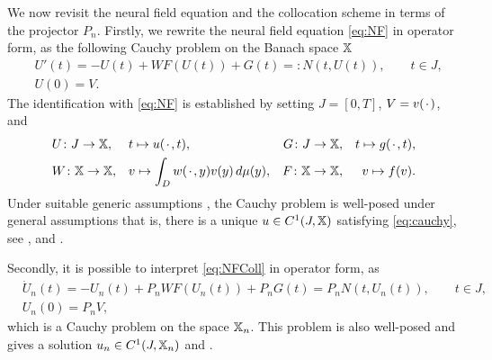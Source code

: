 \documentclass[a4paper]{siamart190516}
\begin{document}
We now revisit the neural field equation and the collocation scheme in terms of the
projector $P_n$. Firstly, we rewrite the neural field equation \cref{eq:NF} in
operator form, as the following Cauchy problem on the Banach space $\mathbb{X}$
\begin{equation}\label{eq:cauchy}
  \begin{aligned}
  & U'(t) = - U(t) + WF(U(t)) + G(t) =:  N(t,U(t)), \qquad t \in J, \\
  & U(0) = V.
  \end{aligned}
\end{equation}
The identification with \cref{eq:NF} is established by setting $J = [0,T]$,
$V = v({\mkern 2mu\cdot\mkern 2mu})$, and
\[  
  \begin{aligned}
   & U \colon J \to \mathbb{X}, && t \mapsto u({\mkern 2mu\cdot\mkern 2mu},t),
   & G \colon J \to \mathbb{X}, && t \mapsto g({\mkern 2mu\cdot\mkern 2mu},t), \\
   & W \colon \mathbb{X} \to \mathbb{X}, && v \mapsto \int_{D} w({\mkern 2mu\cdot\mkern 2mu},y) v(y) \,d \mu(y),
   & F \colon \mathbb{X} \to \mathbb{X}, && v \mapsto f(v). 
  \end{aligned}
\]
Under suitable generic assumptions , the Cauchy problem
is well-posed under general assumptions that is, there is a unique $u \in
C^1(J,\mathbb{X})$ satisfying \cref{eq:cauchy}, see
\cite{Potthast:2009bd,Faugeras:2009gn}, and \cite[Lemma 2.7]{Avitabile:2023ab}.

Secondly, it is possible to interpret \cref{eq:NFColl} in operator form, as
\begin{equation}\label{eq:cauchyPn}
  \begin{aligned}
  & \dot U_n(t) = - U_n(t) + P_n WF(U_n(t)) + P_n G(t) =  P_n N(t,U_n(t)), \qquad t \in J, \\
  & U_n(0) = P_n V,
  \end{aligned}
\end{equation}
which is a Cauchy problem on the space $\mathbb{X}_{n}$. This problem is also well-posed
and gives a solution $u_n \in C^1(J,\mathbb{X}_n)$ and
\cite[Theorem 3.1]{Avitabile:2023ab}.
\end{document}
